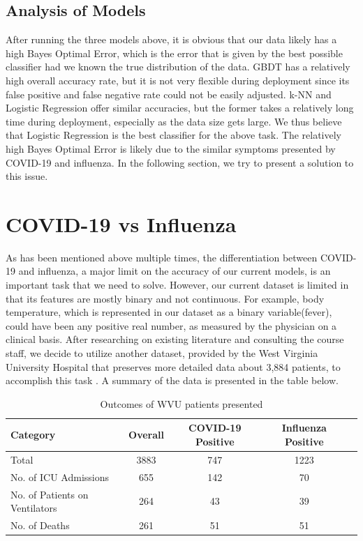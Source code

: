 \documentclass[a4paper, 11pt]{article}
\begin{document}
\subsection*{Analysis of Models}
After running the three models above, it is obvious that our data likely has a high Bayes Optimal Error, which is the error that is given by the best possible classifier had we known the true distribution of the data. GBDT has a relatively high overall accuracy rate, but it is not very flexible during deployment since its false positive and false negative rate could not be easily adjusted. k-NN and Logistic Regression offer similar accuracies, but the former takes a relatively long time during deployment, especially as the data size gets large. We thus believe that Logistic Regression is the best classifier for the above task.
The relatively high Bayes Optimal Error is likely due to the similar symptoms presented by COVID-19 and influenza. In the following section, we try to present a solution to this issue.

\section*{COVID-19 vs Influenza}
As has been mentioned above multiple times, the differentiation between COVID-19 and influenza, a major limit on the accuracy of our current models, is an important task that we need to solve. However, our current dataset is limited in that its features are mostly binary and not continuous. For example, body temperature, which is represented in our dataset as a binary variable(fever), could have been any positive real number, as measured by the physician on a clinical basis. After researching on existing literature and consulting the course staff, we decide to utilize another dataset, provided by the West Virginia University Hospital that preserves more detailed data about 3,884 patients, to accomplish this task \cite{influenza}. A summary of the data is presented in the table below.

\begin{table}[H]
\centering
\caption{Outcomes of WVU patients presented}
\begin{tabular}{| l | c | c | c | c |}
\hline
Category & Overall & COVID-19 Positive & Influenza Positive  \\ \hline
Total & 3883 & 747 & 1223  \\ \hline
No. of ICU Admissions & 655 & 142 & 70  \\ \hline
No. of Patients on Ventilators & 264 & 43 & 39  \\ \hline
No. of Deaths & 261 & 51 & 51  \\ 
\hline
\end{tabular}
\label{Table}
\end{table}
\end{document}
